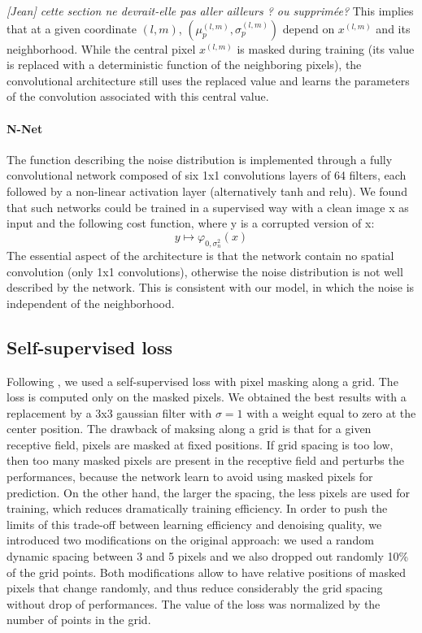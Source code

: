 \documentclass{article}
\begin{document}
\textit{[Jean] cette section ne devrait-elle pas aller ailleurs ? ou supprimée?}
This implies that at a given coordinate $(l,m)$, $(\mu_p^{(l,m)}, \sigma_p^{(l,m)})$ depend on $x^{(l,m)}$ and its neighborhood.
While the central pixel $x^{(l,m)}$ is masked during training (its value is replaced with a deterministic function of the neighboring pixels), the convolutional architecture still uses the replaced value and learns the parameters of the convolution associated with this central value.

\paragraph{N-Net}
The function describing the noise distribution is implemented through a fully convolutional network composed of six 1x1 convolutions layers of 64 filters, each followed by a non-linear activation layer (alternatively tanh and relu).
We found that such networks could be trained in a supervised way with a clean image x as input and the following cost function, where y is a corrupted version of x:
$$
y\mapsto\varphi_{0,\sigma_n^2}(x)
$$
The essential aspect of the architecture is that the network contain no spatial convolution (only 1x1 convolutions), otherwise the noise distribution is not well described by the network. This is consistent with our model, in which the noise is independent of the neighborhood.

\subsection{Self-supervised loss}
Following \cite{batson2019noise2self}, we used a self-supervised loss with pixel masking along a grid. The loss is computed only on the masked pixels.
We obtained the best results with a replacement by a 3x3 gaussian filter with $\sigma=1$ with a weight equal to zero at the center position.
The drawback of maksing along a grid is that for a given receptive field, pixels are masked at fixed positions. If grid spacing is too low, then too many masked pixels are present in the receptive field and perturbs the performances, because the network learn to avoid using masked pixels for prediction. On the other hand, the larger the spacing, the less pixels are used for training, which reduces dramatically training efficiency.
In order to push the limits of this trade-off between learning efficiency and denoising quality, we introduced two modifications on the original approach: we used a random dynamic spacing between 3 and 5 pixels and we also dropped out randomly 10\% of the grid points. Both modifications allow to have relative positions of masked pixels that change randomly, and thus reduce considerably the grid spacing without drop of performances. The value of the loss was normalized by the number of points in the grid.
\end{document}
